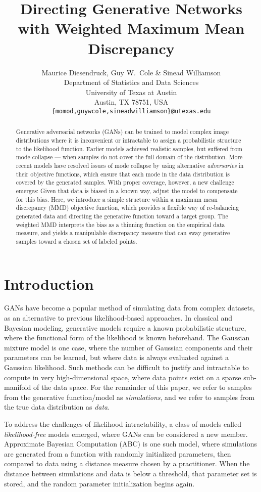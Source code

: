 \documentclass{article} %
\title{Directing Generative Networks with Weighted Maximum Mean Discrepancy}
\author{Maurice Diesendruck, Guy W.~Cole \& Sinead Williamson \\
Department of Statistics and Data Sciences\\
University of Texas at Austin\\
Austin, TX 78751, USA \\
\texttt{\{momod,guywcole,sineadwilliamson\}@utexas.edu}}
\begin{document}
\maketitle

\begin{abstract}
Generative adversarial networks (GANs) can be trained to model complex image distributions where it is inconvenient or intractable to assign a probabilistic structure to the likelihood function. Earlier models achieved realistic samples, but suffered from mode collapse --- when samples do not cover the full domain of the distribution. More recent models have resolved issues of mode collapse by using alternative \textit{adversaries} in their objective functions, which ensure that each mode in the data distribution is covered by the generated samples. With proper coverage, however, a new challenge emerges: Given that data is biased in a known way, adjust the model to compensate for this bias. Here, we introduce a simple structure within a maximum mean discrepancy (MMD) objective function, which provides a flexible way of re-balancing generated data and directing the generative function toward a target group. The weighted MMD interprets the bias as a thinning function on the empirical data measure, and yields a manipulable discrepancy measure that can sway generative samples toward a chosen set of labeled points. \end{abstract}

\section{Introduction}

GANs have become a popular method of simulating data from complex datasets, as an alternative to previous likelihood-based approaches. In classical and Bayesian modeling, generative models require a known probabilistic structure, where the functional form of the likelihood is known beforehand. The Gaussian mixture model is one case, where the number of Gaussian components and their parameters can be learned, but where data is always evaluated against a Gaussian likelihood. Such methods can be difficult to justify and intractable to compute in very high-dimensional space, where data points exist on a sparse sub-manifold of the data space. For the remainder of this paper, we refer to samples from the generative function/model as \textit{simulations}, and we refer to samples from the true data distribution as \textit{data}.

To address the challenges of likelihood intractability, a class of models called \textit{likelihood-free} models emerged, where GANs can be considered a new member. Approximate Bayesian Computation (ABC) is one such model, where simulations are generated from a function with randomly initialized parameters, then compared to data using a distance measure chosen by a practitioner. When the distance between simulations and data is below a threshold, that parameter set is stored, and the random parameter initialization begins again.
\end{document}
